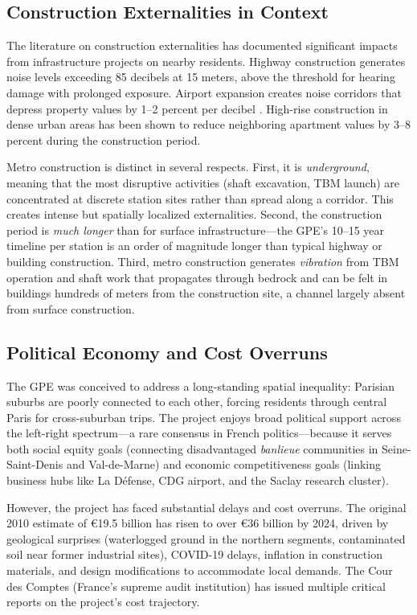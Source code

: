 \documentclass[12pt]{article}
\begin{document}
\subsection{Construction Externalities in Context}

The literature on construction externalities has documented significant impacts from infrastructure projects on nearby residents. Highway construction generates noise levels exceeding 85 decibels at 15 meters, above the threshold for hearing damage with prolonged exposure. Airport expansion creates noise corridors that depress property values by 1--2 percent per decibel \citep{mcmillen2004airport}. High-rise construction in dense urban areas has been shown to reduce neighboring apartment values by 3--8 percent during the construction period.

Metro construction is distinct in several respects. First, it is \textit{underground}, meaning that the most disruptive activities (shaft excavation, TBM launch) are concentrated at discrete station sites rather than spread along a corridor. This creates intense but spatially localized externalities. Second, the construction period is \textit{much longer} than for surface infrastructure---the GPE's 10--15 year timeline per station is an order of magnitude longer than typical highway or building construction. Third, metro construction generates \textit{vibration} from TBM operation and shaft work that propagates through bedrock and can be felt in buildings hundreds of meters from the construction site, a channel largely absent from surface construction.

\subsection{Political Economy and Cost Overruns}

The GPE was conceived to address a long-standing spatial inequality: Parisian suburbs are poorly connected to each other, forcing residents through central Paris for cross-suburban trips. The project enjoys broad political support across the left-right spectrum---a rare consensus in French politics---because it serves both social equity goals (connecting disadvantaged \textit{banlieue} communities in Seine-Saint-Denis and Val-de-Marne) and economic competitiveness goals (linking business hubs like La D\'{e}fense, CDG airport, and the Saclay research cluster).

However, the project has faced substantial delays and cost overruns. The original 2010 estimate of \euro19.5 billion has risen to over \euro36 billion by 2024, driven by geological surprises (waterlogged ground in the northern segments, contaminated soil near former industrial sites), COVID-19 delays, inflation in construction materials, and design modifications to accommodate local demands. The Cour des Comptes (France's supreme audit institution) has issued multiple critical reports on the project's cost trajectory.
\end{document}
